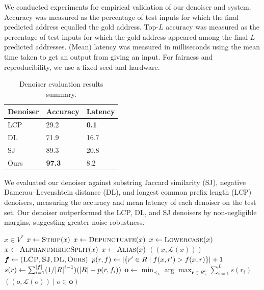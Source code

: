 \documentclass{article}
\theoremstyle{definition}
\begin{document}
We conducted experiments for empirical validation of our denoiser and system.
Accuracy was measured as the percentage of test inputs for which the final predicted address equalled the gold address.
Top-$L$ accuracy was measured as the percentage of test inputs for which the gold address appeared among the final $L$ predicted addresses.
(Mean) latency was measured in milliseconds using the mean time taken to get an output from giving an input.
For fairness and reproducibility, we use a fixed seed and hardware.

\begin{table}[H]
	\centering
	\begin{tabular}{lll}
		\toprule
		\textbf{Denoiser} & \textbf{Accuracy} & \textbf{Latency} \\
		\midrule
		LCP & 29.2 & \textbf{0.1} \\
		DL & 71.9 & 16.7 \\
		SJ & 89.3 & 20.8 \\
		Ours & \textbf{97.3} & 8.2 \\
		\bottomrule
	\end{tabular}
	\caption{Denoiser evaluation results summary.}
\end{table}

We evaluated our denoiser against
substring Jaccard similarity (SJ),
negative Damerau--Levenshtein distance (DL),
and
longest common prefix length (LCP)
denoisers,
measuring the accuracy and mean latency of each denoiser on the test set.
Our denoiser outperformed the LCP, DL, and SJ denoisers by non-negligible margins,
suggesting greater noise robustness.

\begin{algorithm}[H]
	\caption{$\textsc{Predict}(x)$}
	\begin{algorithmic}
		\Require $x\in V^{*}$
		\State $x\gets\textsc{Strip}(x)$
		\State $x\gets\textsc{Depunctuate}(x)$
		\State $x\gets\textsc{Lowercase}(x)$
		\State $x\gets\textsc{AlphanumericSplit}(x)$
		\State $x\gets\textsc{Alias}(x)$
			\Return $((x,\mathscr{L}(x)))$
		\EndIf
		\State ${
			\bm{f}
			\gets
			(
				\textsc{LCP},
				\textsc{SJ},
				\textsc{DL},
				\textsc{Ours}
			)
		}$
				\State ${
					p(r,f)
					\gets
					\abs{\{r'\in R\mid f(x,r')>f(x,r)\}}
					+
					1
				}$
			\EndFor
		\EndFor
			\State ${
				s(r)
				\gets
				\sum_{i=1}^{\abs{\bm{f}}}
				(1/\abs{R}^{i-1})
				(\abs{R}-p(r,f_{i}))
			}$
		\EndFor
		\State ${
			\bm{o}
			\gets
			\min_{\prec_{L}}
			\arg\max_{\bm{r}\in R_{\prec}^{L}}
			\sum_{i=1}^{L}
			s(r_{i})
		}$
		\State \Return $((o,\mathscr{L}(o))\mid o\in\bm{o})$
	\end{algorithmic}
\end{algorithm}
\end{document}

